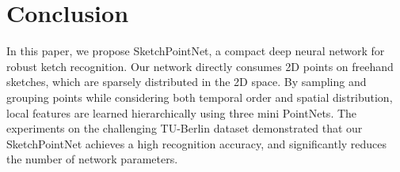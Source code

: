 \section{Conclusion}
\label{sec:conclusion}

In this paper, we propose SketchPointNet, a compact deep neural network for robust ketch recognition.
%
Our network directly consumes 2D points on freehand sketches, which are sparsely distributed in the 2D space. 
%
By sampling and grouping points while considering both temporal order and spatial distribution, local features are learned hierarchically using three mini PointNets. 
%
The experiments on the challenging TU-Berlin dataset demonstrated that our SketchPointNet achieves a high recognition accuracy, and significantly reduces the number of network parameters. 